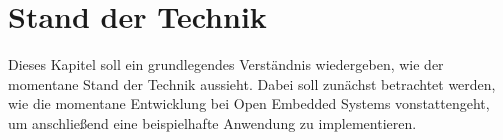 \chapter{Stand der Technik}
\label{chap:standTechnik}
Dieses Kapitel soll ein grundlegendes Verständnis wiedergeben, wie der momentane Stand der
Technik aussieht. Dabei soll zunächst betrachtet werden, wie die
momentane Entwicklung bei Open Embedded Systems vonstattengeht, um anschließend eine
beispielhafte Anwendung zu implementieren.

